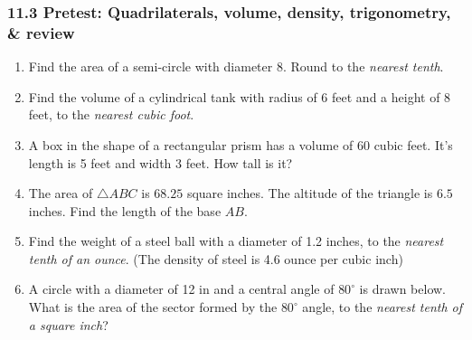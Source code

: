 \documentclass[12pt, twoside]{article}
\begin{document}
\subsubsection*{11.3 Pretest: Quadrilaterals, volume, density, trigonometry, \& review}
 \begin{enumerate}

  \item Find the area of a semi-circle with diameter 8. Round to the \emph{nearest tenth}.\vspace{3cm}

  \item Find the volume of a cylindrical tank with radius of $6$ feet and a height of 8 feet, to the \emph{nearest cubic foot}. \vspace{2.5cm}

  \item A box in the shape of a rectangular prism has a volume of 60 cubic feet. It's length is 5 feet and width 3 feet. How tall is it? \vspace{3.0cm}

  \item The area of $\triangle ABC$ is $68.25$ square inches. The altitude of the triangle is $6.5$ inches. Find the length of the base $AB$.\\[0.5cm]
   \vspace{0.25cm}

  \item Find the weight of a steel ball with a diameter of 1.2 inches, to the \emph{nearest tenth of an ounce}. (The density of steel is 4.6 ounce per cubic inch)

\newpage

  \item A circle with a diameter of 12 in and a central angle of $80^\circ$ is drawn below. What is the area of the sector formed by the $80^\circ$ angle, to the \emph{nearest tenth of a square inch}?\\[0.25cm]
   \vspace{0.5cm}


\end{enumerate}
\end{document}
